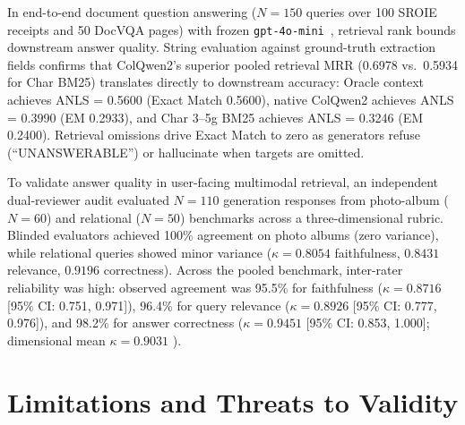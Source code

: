 In end-to-end document question answering ($N=150$ queries over 100 SROIE receipts and 50 DocVQA pages) with frozen \texttt{gpt-4o-mini}~\cite{zheng2023judging}, retrieval rank bounds downstream answer quality. String evaluation against ground-truth extraction fields confirms that ColQwen2's superior pooled retrieval MRR (0.6978 vs.\ 0.5934 for Char BM25) translates directly to downstream accuracy: Oracle context achieves ANLS = 0.5600 (Exact Match 0.5600), native ColQwen2 achieves ANLS = 0.3990 (EM 0.2933), and Char 3--5g BM25 achieves ANLS = 0.3246 (EM 0.2400). Retrieval omissions drive Exact Match to zero as generators refuse (``UNANSWERABLE'') or hallucinate when targets are omitted.

To validate answer quality in user-facing multimodal retrieval, an independent dual-reviewer audit evaluated $N=110$ generation responses from photo-album ($N=60$) and relational ($N=50$) benchmarks across a three-dimensional rubric. Blinded evaluators achieved 100\% agreement on photo albums (zero variance), while relational queries showed minor variance ($\kappa = 0.8054$ faithfulness, $0.8431$ relevance, $0.9196$ correctness). Across the pooled benchmark, inter-rater reliability was high: observed agreement was 95.5\% for faithfulness ($\kappa = 0.8716$ [95\% CI: 0.751, 0.971]), 96.4\% for query relevance ($\kappa = 0.8926$ [95\% CI: 0.777, 0.976]), and 98.2\% for answer correctness ($\kappa = 0.9451$ [95\% CI: 0.853, 1.000]; dimensional mean $\kappa = 0.9031$ \cite{cohen1960coefficient}).

\vspace{3.5mm}
\section{Limitations and Threats to Validity}
\label{sec:limitations}

